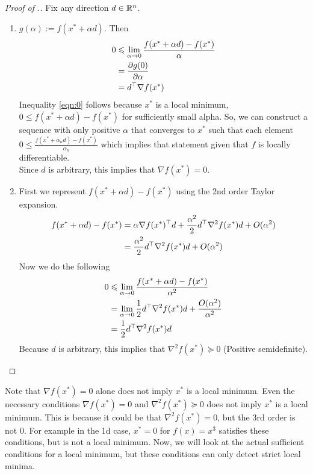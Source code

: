 \begin{proof}[Proof of .]
Fix any direction $d \in \mathbb{R}^n$.
\begin{enumerate}
    \item $g(\alpha) := f(x^* + \alpha d)$. Then
    \begin{align}
        0 &\leqslant \lim_{\alpha \to 0} \frac{f(x^* + \alpha d) - f(x^*)}{\alpha} \label{eqn:0}\\
        &= \frac{\partial g(0)}{\partial \alpha} \nonumber\\
        &= d^\top \nabla f(x^*) \nonumber
    \end{align}
    Inequality \ref{eqn:0} follows because $x^*$ is a local minimum, $0 \le f(x^* + \alpha d) - f(x^*)$ for sufficiently small alpha. So, we can construct a sequence with only positive $\alpha$ that converges to $x^*$ such that each element $0 \le \frac{f(x^* + \alpha_n d) - f(x^*)}{\alpha_n}$ which implies that statement given that $f$ is locally differentiable.\\
    \newline
    Since $d$ is arbitrary, this implies that $\nabla f(x^*) = 0$.
    \item First we represent $f(x^* + \alpha d) - f(x^*)$ using the 2nd order Taylor expansion.
    \begin{align*}
        f(x^* + \alpha d) - f(x^*) &= \alpha \nabla f(x^*)^\top d + \frac{\alpha^2}{2}d^\top \nabla^2 f(x^*)d + O(\alpha^2) \nonumber\\
        &= \frac{\alpha^2}{2} d^\top \nabla^2 f(x^*) d + O(\alpha^2)\\
    \end{align*}
    Now we do the following
    \begin{align*}
        0 &\leqslant \lim_{\alpha \to 0} \frac{f(x^* + \alpha d) - f(x^*)}{\alpha^2}\\
        &= \lim_{\alpha \to 0} \frac{1}{2}d^\top \nabla^2 f(x^*) d + \frac{O(\alpha^2)}{\alpha^2}\\
        &= \frac{1}{2}d^\top \nabla^2 f(x^*) d
    \end{align*}
    Because $d$ is arbitrary, this implies that $\nabla^2 f(x^*) \succeq 0$ (Positive semidefinite).
    
\end{enumerate}
\end{proof}

Note that $\nabla f(x^*) = 0$ alone does not imply $x^*$ is a local minimum. Even the necessary conditions $\nabla f(x^*) = 0$ and $\nabla^2 f(x^*) \succeq 0$ does not imply $x^*$ is a local minimum. This is because it could be that $\nabla^2 f(x^*) = 0$, but the 3rd order is not 0. For example in the 1d case, $x^* = 0$ for $f(x) = x^3$ satisfies these conditions, but is not a local minimum. Now, we will look at the actual sufficient conditions for a local minimum, but these conditions can only detect strict local minima.

